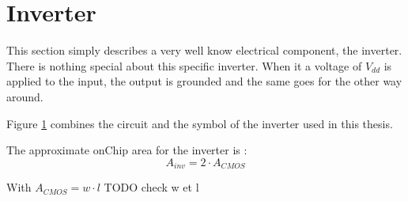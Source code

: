 \section{Inverter}
\label{sec:inv}

This section simply describes a very well know electrical component, the inverter. There is nothing special about this specific inverter. When it a voltage of $V_{dd}$ is applied to the input, the output is grounded and the same goes for the other way around.

\begin{figure}[H]
  \centering
  \hspace*{2.5cm}
  \hfill
  \hspace*{1.5cm}
  \caption{}
  \label{fig:inv}
\end{figure}

Figure \ref{fig:inv} combines the circuit and the symbol of the inverter used in this thesis.

The approximate onChip area for the inverter is :
\begin{equation}
  A_{inv}=2\cdot A_{CMOS}
\end{equation}

With $A_{CMOS}= w\cdot l$ TODO check w et l
